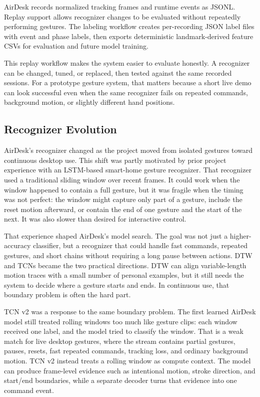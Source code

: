 \documentclass[manuscript]{acmart}
\begin{document}
AirDesk records normalized tracking frames and runtime events as JSONL. Replay support allows recognizer changes to be evaluated without repeatedly performing gestures. The labeling workflow creates per-recording JSON label files with event and phase labels, then exports deterministic landmark-derived feature CSVs for evaluation and future model training.

This replay workflow makes the system easier to evaluate honestly. A recognizer can be changed, tuned, or replaced, then tested against the same recorded sessions. For a prototype gesture system, that matters because a short live demo can look successful even when the same recognizer fails on repeated commands, background motion, or slightly different hand positions.

\subsection{Recognizer Evolution}

AirDesk's recognizer changed as the project moved from isolated gestures toward continuous desktop use. This shift was partly motivated by prior project experience with an LSTM-based smart-home gesture recognizer. That recognizer used a traditional sliding window over recent frames. It could work when the window happened to contain a full gesture, but it was fragile when the timing was not perfect: the window might capture only part of a gesture, include the reset motion afterward, or contain the end of one gesture and the start of the next. It was also slower than desired for interactive control.

That experience shaped AirDesk's model search. The goal was not just a higher-accuracy classifier, but a recognizer that could handle fast commands, repeated gestures, and short chains without requiring a long pause between actions. DTW and TCNs became the two practical directions. DTW can align variable-length motion traces with a small number of personal examples, but it still needs the system to decide where a gesture starts and ends. In continuous use, that boundary problem is often the hard part.

TCN v2 was a response to the same boundary problem. The first learned AirDesk model still treated rolling windows too much like gesture clips: each window received one label, and the model tried to classify the window. That is a weak match for live desktop gestures, where the stream contains partial gestures, pauses, resets, fast repeated commands, tracking loss, and ordinary background motion. TCN v2 instead treats a rolling window as compute context. The model can produce frame-level evidence such as intentional motion, stroke direction, and start/end boundaries, while a separate decoder turns that evidence into one command event.
\end{document}
